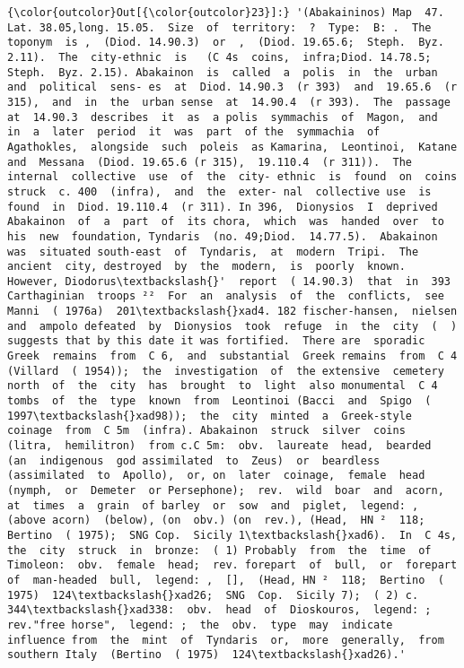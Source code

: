 \documentclass[10pt]{article}
\begin{document}
\begin{Verbatim}[commandchars=\\\{\}]
{\color{outcolor}Out[{\color{outcolor}23}]:} '(Abakaininos) Map  47.  Lat. 38.05,long. 15.05.  Size  of  territory:  ?  Type:  B: .  The  toponym  is ,  (Diod. 14.90.3)  or  ,  (Diod. 19.65.6;  Steph.  Byz. 2.11).  The  city-ethnic  is   (C 4s  coins,  infra;Diod. 14.78.5;  Steph.  Byz. 2.15). Abakainon  is  called  a  polis  in  the  urban  and  political  sens- es  at  Diod. 14.90.3  (r 393)  and  19.65.6  (r 315),  and  in  the  urban sense  at  14.90.4  (r 393).  The  passage  at  14.90.3  describes  it  as  a polis  symmachis  of  Magon,  and  in  a  later  period  it  was  part  of the  symmachia  of  Agathokles,  alongside  such  poleis  as Kamarina,  Leontinoi,  Katane  and  Messana  (Diod. 19.65.6 (r 315),  19.110.4  (r 311)).  The  internal  collective  use  of  the  city- ethnic  is  found  on  coins  struck  c. 400  (infra),  and  the  exter- nal  collective use  is  found  in  Diod. 19.110.4  (r 311). In 396,  Dionysios  I  deprived  Abakainon  of  a  part  of  its chora,  which  was  handed  over  to  his  new  foundation, Tyndaris  (no. 49;Diod.  14.77.5).  Abakainon  was  situated south-east  of  Tyndaris,  at  modern  Tripi.  The  ancient  city, destroyed  by  the  modern,  is  poorly  known.  However, Diodorus\textbackslash{}'  report  ( 14.90.3)  that  in  393  Carthaginian  troops ²²  For  an  analysis  of  the  conflicts,  see  Manni  ( 1976a)  201\textbackslash{}xad4. 182 fischer-hansen,  nielsen  and  ampolo defeated  by  Dionysios  took  refuge  in  the  city  (  ) suggests that by this date it was fortified.  There are  sporadic  Greek  remains  from  C 6,  and  substantial  Greek remains  from  C 4  (Villard  ( 1954));  the  investigation  of  the extensive  cemetery  north  of  the  city  has  brought  to  light  also monumental  C 4  tombs  of  the  type  known  from  Leontinoi (Bacci  and  Spigo  ( 1997\textbackslash{}xad98));  the  city  minted  a  Greek-style coinage  from  C 5m  (infra). Abakainon  struck  silver  coins  (litra,  hemilitron)  from c.C 5m:  obv.  laureate  head,  bearded  (an  indigenous  god assimilated  to  Zeus)  or  beardless  (assimilated  to  Apollo),  or, on  later  coinage,  female  head  (nymph,  or  Demeter  or Persephone);  rev.  wild  boar  and  acorn,  at  times  a  grain  of barley  or  sow  and  piglet,  legend: ,  (above acorn)  (below), (on  obv.) (on  rev.), (Head,  HN ²  118;  Bertino  ( 1975);  SNG Cop.  Sicily 1\textbackslash{}xad6).  In  C 4s,  the  city  struck  in  bronze:  ( 1) Probably  from  the  time  of  Timoleon:  obv.  female  head;  rev. forepart  of  bull,  or  forepart  of  man-headed  bull,  legend: ,  [],  (Head, HN ²  118;  Bertino  ( 1975)  124\textbackslash{}xad26;  SNG  Cop.  Sicily 7);  ( 2) c. 344\textbackslash{}xad338:  obv.  head  of  Dioskouros,  legend: ;  rev."free horse",  legend: ;  the  obv.  type  may  indicate  influence from  the  mint  of  Tyndaris  or,  more  generally,  from  southern Italy  (Bertino  ( 1975)  124\textbackslash{}xad26).'
\end{Verbatim}
        
\end{document}
